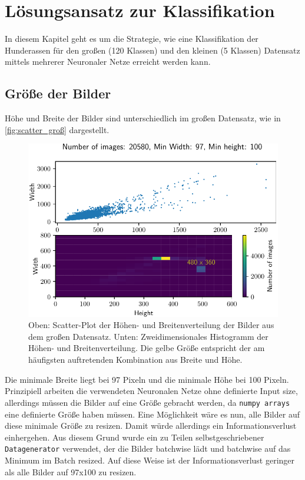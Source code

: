 \chapter{Lösungsansatz zur Klassifikation}
In diesem Kapitel geht es um die Strategie, wie eine Klassifikation der
Hunderassen für den großen (120 Klassen) und den kleinen (5 Klassen) Datensatz
mittels mehrerer Neuronaler Netze erreicht werden kann.

\section{Größe der Bilder}
Höhe und Breite der Bilder sind unterschiedlich im großen Datensatz, wie in
\autoref{fig:scatter_groß} dargestellt.

\begin{figure}
  \centering
  \includegraphics[scale=0.9]{pics/width_height_scatter_hist2d.pdf}
  \caption{Oben: Scatter-Plot der Höhen- und Breitenverteilung der Bilder aus dem großen Datensatz.
  Unten: Zweidimensionales Histogramm der Höhen- und Breitenverteilung.
  Die gelbe Größe entspricht der am häufigsten auftretenden Kombination
  aus Breite und Höhe.}
  \label{fig:scatter_groß}
\end{figure}

Die minimale Breite liegt bei 97 Pixeln und die minimale Höhe bei 100 Pixeln.
Prinzipiell arbeiten die verwendeten Neuronalen Netze ohne definierte Input
size, allerdings müssen die Bilder auf eine Größe gebracht werden, da
\texttt{numpy arrays} eine definierte Größe haben müssen. Eine Möglichkeit wäre
es nun, alle Bilder auf diese minimale Größe zu resizen. Damit würde allerdings
ein Informationsverlust einhergehen. Aus diesem Grund wurde ein zu Teilen
selbstgeschriebener \texttt{Datagenerator} verwendet, der die Bilder batchwise
lädt und batchwise auf das Minimum im Batch resized. Auf diese Weise ist der
Informationsverlust geringer als alle Bilder auf 97x100 zu resizen.

